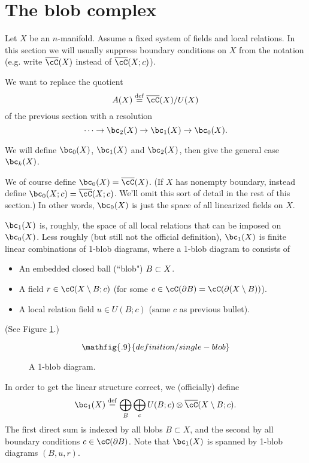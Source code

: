 
\section{The blob complex}
\label{sec:blob-definition}

Let $X$ be an $n$-manifold.
Assume a fixed system of fields and local relations.
In this section we will usually suppress boundary conditions on $X$ from the notation
(e.g. write $\lf(X)$ instead of $\lf(X; c)$).

We want to replace the quotient
\[
	A(X) \deq \lf(X) / U(X)
\]
of the previous section with a resolution
\[
	\cdots \to \bc_2(X) \to \bc_1(X) \to \bc_0(X) .
\]

We will define $\bc_0(X)$, $\bc_1(X)$ and $\bc_2(X)$, then give the general case $\bc_k(X)$.

We of course define $\bc_0(X) = \lf(X)$.
(If $X$ has nonempty boundary, instead define $\bc_0(X; c) = \lf(X; c)$.
We'll omit this sort of detail in the rest of this section.)
In other words, $\bc_0(X)$ is just the space of all linearized fields on $X$.

$\bc_1(X)$ is, roughly, the space of all local relations that can be imposed on $\bc_0(X)$.
Less roughly (but still not the official definition), $\bc_1(X)$ is finite linear
combinations of 1-blob diagrams, where a 1-blob diagram to consists of
\begin{itemize}
\item An embedded closed ball (``blob") $B \subset X$.
\item A field $r \in \cC(X \setmin B; c)$
(for some $c \in \cC(\bd B) = \cC(\bd(X \setmin B))$).
\item A local relation field $u \in U(B; c)$
(same $c$ as previous bullet).
\end{itemize}
(See Figure \ref{blob1diagram}.)
\begin{figure}[!ht]\begin{equation*}
\mathfig{.9}{definition/single-blob}
\end{equation*}\caption{A 1-blob diagram.}\label{blob1diagram}\end{figure}
In order to get the linear structure correct, we (officially) define
\[
	\bc_1(X) \deq \bigoplus_B \bigoplus_c U(B; c) \otimes \lf(X \setmin B; c) .
\]
The first direct sum is indexed by all blobs $B\subset X$, and the second
by all boundary conditions $c \in \cC(\bd B)$.
Note that $\bc_1(X)$ is spanned by 1-blob diagrams $(B, u, r)$.

